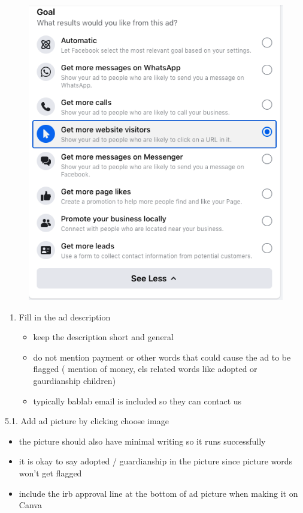 \documentclass[]{book}
\begin{document}
\begin{figure}
\centering
\includegraphics{images/lab_protocols/fb_ads/4.png}
\caption{}
\end{figure}

\begin{enumerate}
\def\labelenumi{\arabic{enumi}.}
\setcounter{enumi}{4}
\item
  Fill in the ad description

  \begin{itemize}
  \item
    keep the description short and general
  \item
    do not mention payment or other words that could cause the ad to be flagged ( mention of money, els related words like adopted or gaurdianship children)
  \item
    typically bablab email is included so they can contact us
  \end{itemize}
\end{enumerate}

5.1. Add ad picture by clicking choose image

\begin{itemize}
\item
  the picture should also have minimal writing so it runs successfully
\item
  it is okay to say adopted / guardianship in the picture since picture words won't get flagged
\item
  include the irb approval line at the bottom of ad picture when making it on Canva
\end{itemize}
\end{document}
